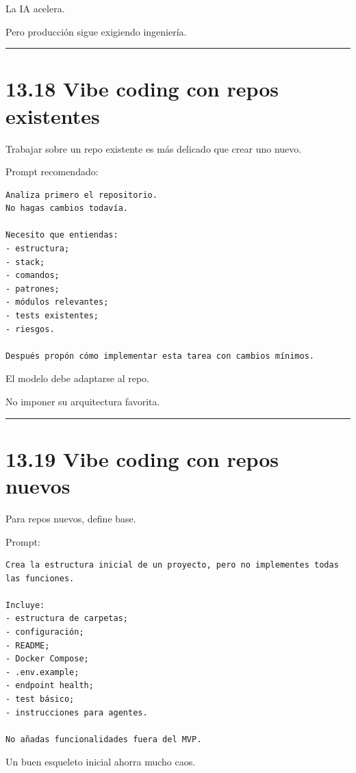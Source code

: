 La IA acelera.

Pero producción sigue exigiendo ingeniería.

\begin{center}\rule{0.5\linewidth}{0.5pt}\end{center}

\section{13.18 Vibe coding con repos
existentes}\label{vibe-coding-con-repos-existentes}

Trabajar sobre un repo existente es más delicado que crear uno nuevo.

Prompt recomendado:

\begin{lstlisting}
Analiza primero el repositorio.
No hagas cambios todavía.

Necesito que entiendas:
- estructura;
- stack;
- comandos;
- patrones;
- módulos relevantes;
- tests existentes;
- riesgos.

Después propón cómo implementar esta tarea con cambios mínimos.
\end{lstlisting}

El modelo debe adaptarse al repo.

No imponer su arquitectura favorita.

\begin{center}\rule{0.5\linewidth}{0.5pt}\end{center}

\section{13.19 Vibe coding con repos
nuevos}\label{vibe-coding-con-repos-nuevos}

Para repos nuevos, define base.

Prompt:

\begin{lstlisting}
Crea la estructura inicial de un proyecto, pero no implementes todas las funciones.

Incluye:
- estructura de carpetas;
- configuración;
- README;
- Docker Compose;
- .env.example;
- endpoint health;
- test básico;
- instrucciones para agentes.

No añadas funcionalidades fuera del MVP.
\end{lstlisting}

Un buen esqueleto inicial ahorra mucho caos.

